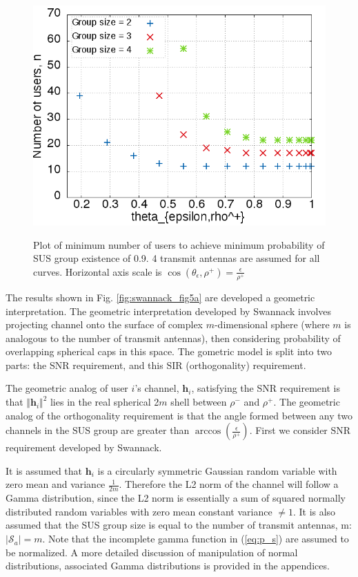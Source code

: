 \begin{figure}
    \includegraphics[width=12cm]{figs/existence.png}\\
    \caption{Plot of minimum number of users to achieve minimum probability of SUS group existence of 0.9. 4 transmit antennas are assumed for all curves. Horizontal axis scale is $\cos{(\theta_\epsilon,\rho^+)} = \frac{\epsilon}{\rho^+}$}
    \label{fig:reproduce_fig5a}
\end{figure}

The results shown in Fig. \ref{fig:swannack_fig5a} are developed a geometric interpretation. The geometric interpretation developed by Swannack involves projecting channel onto the surface of complex $m$-dimensional sphere (where $m$ is analogous to the number of transmit antennas), then considering probability of overlapping spherical caps in this space. The gometric model is split into two parts: the SNR requirement, and this SIR (orthogonality) requirement.

The geometric analog of user $i$'s channel, $\textbf{h}_i$, satisfying the SNR requirement is that $\Vert\textbf{h}_i\Vert^2$ lies in the real spherical 2$m$ shell between $\rho^-$ and $\rho^+$. The geometric analog of the orthogonality requirement is that the angle formed between any two channels in the SUS group are greater than $\arccos{(\frac{\epsilon}{\rho^+})}$. First we consider SNR requirement developed by Swannack.

It is assumed that $\textbf{h}_i$ is a circularly symmetric Gaussian random variable with zero mean and variance  $\frac{1}{2m}$. Therefore the L2 norm of the channel will follow a Gamma distribution, since the L2 norm is essentially a sum of squared normally distributed random variables with zero mean constant variance $\neq 1$. It is also assumed that the SUS group size is equal to the number of transmit antennas, m: $\vert \mathcal{S}_a\vert = m$. Note that the incomplete gamma function in (\ref{eq:p_s}) are assumed to be normalized. A more detailed discussion of manipulation of normal distributions, associated Gamma distributions is provided in the appendices. 

